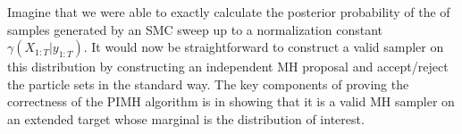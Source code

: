 Imagine that we were able to exactly calculate the posterior probability of the of samples
generated by an SMC sweep up to a normalization constant $\gamma(X_{1:T} |y_{1:T})$.  It would
now be straightforward to construct a valid sampler on this distribution by constructing an independent
MH proposal and accept/reject the particle sets in the standard way.  
The key components of proving the correctness of the PIMH algorithm is in showing that it is a valid
MH sampler on an extended target whose marginal is the distribution of interest.

